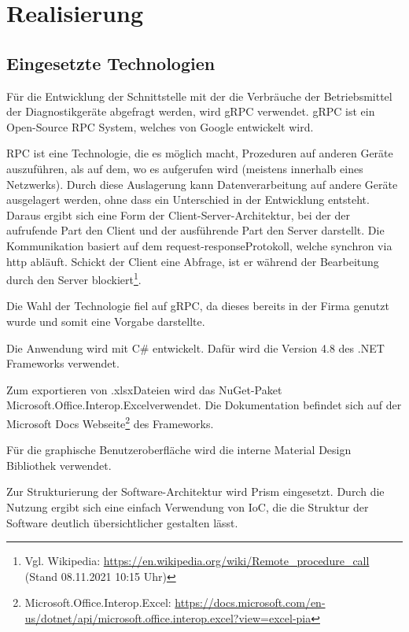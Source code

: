 \section{Realisierung}
\label{sec:Realisierung}

\subsection{Eingesetzte Technologien}
\label{sec:EingesetzteTechnologien}
Für die Entwicklung der Schnittstelle mit der die Verbräuche der Betriebsmittel der Diagnostikgeräte abgefragt werden, wird {\acs{gRPC}} verwendet. {\acs{gRPC}} ist ein Open-Source {\acs{RPC}} System, welches von Google entwickelt wird.

{\ac{RPC}} ist eine Technologie, die es möglich macht, Prozeduren auf anderen Geräte auszuführen, als auf dem, wo es aufgerufen wird (meistens innerhalb eines Netzwerks). Durch diese Auslagerung kann Datenverarbeitung auf andere Geräte ausgelagert werden, ohne dass ein Unterschied in der Entwicklung entsteht. Daraus ergibt sich eine Form der Client-Server-Architektur, bei der der aufrufende Part den Client und der ausführende Part den Server darstellt. Die Kommunikation basiert auf dem \glqq request-response\grqq \space Protokoll, welche synchron via http abläuft. Schickt der Client eine Abfrage, ist er während der Bearbeitung durch den Server blockiert\footnote{Vgl. Wikipedia: \url{https://en.wikipedia.org/wiki/Remote_procedure_call} (Stand 08.11.2021 10:15 Uhr)}.

Die Wahl der Technologie fiel auf {\acs{gRPC}}, da dieses bereits in der Firma genutzt wurde und somit eine Vorgabe darstellte.

Die Anwendung wird mit C\# entwickelt. Dafür wird die Version 4.8 des .NET Frameworks verwendet.

Zum exportieren von \glqq .xlsx\grqq \space Dateien wird das {\acs{NuGet}}-Paket \glqq Microsoft.Office.Interop.Excel\grqq \space verwendet. Die Dokumentation befindet sich auf der Microsoft Docs Webseite\footnote{Microsoft.Office.Interop.Excel: \url{https://docs.microsoft.com/en-us/dotnet/api/microsoft.office.interop.excel?view=excel-pia}} des Frameworks.

Für die graphische Benutzeroberfläche wird die {\betriebNameKzf} interne {\acs{Material Design}} Bibliothek verwendet.

Zur Strukturierung der Software-Architektur wird {\acs{Prism}} eingesetzt. Durch die Nutzung ergibt sich eine einfach Verwendung von  {\acs{IoC}}, die die Struktur der Software deutlich übersichtlicher gestalten lässt.